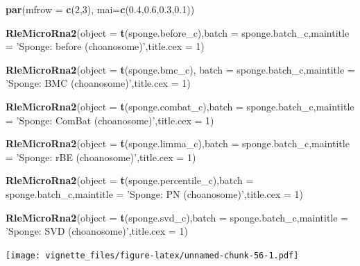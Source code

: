\documentclass[]{book}
\newenvironment{Shaded}{\begin{snugshade}}{\end{snugshade}}
\newcommand{\KeywordTok}[1]{\textcolor[rgb]{0.13,0.29,0.53}{\textbf{#1}}}
\newcommand{\DataTypeTok}[1]{\textcolor[rgb]{0.13,0.29,0.53}{#1}}
\newcommand{\DecValTok}[1]{\textcolor[rgb]{0.00,0.00,0.81}{#1}}
\newcommand{\FloatTok}[1]{\textcolor[rgb]{0.00,0.00,0.81}{#1}}
\newcommand{\StringTok}[1]{\textcolor[rgb]{0.31,0.60,0.02}{#1}}
\newcommand{\NormalTok}[1]{#1}
\begin{document}
\begin{Shaded}
\begin{Highlighting}[]
\KeywordTok{par}\NormalTok{(}\DataTypeTok{mfrow =} \KeywordTok{c}\NormalTok{(}\DecValTok{2}\NormalTok{,}\DecValTok{3}\NormalTok{), }\DataTypeTok{mai=}\KeywordTok{c}\NormalTok{(}\FloatTok{0.4}\NormalTok{,}\FloatTok{0.6}\NormalTok{,}\FloatTok{0.3}\NormalTok{,}\FloatTok{0.1}\NormalTok{))}

\KeywordTok{RleMicroRna2}\NormalTok{(}\DataTypeTok{object =} \KeywordTok{t}\NormalTok{(sponge.before_c),}\DataTypeTok{batch =}\NormalTok{ sponge.batch_c,}\DataTypeTok{maintitle =} \StringTok{'Sponge: before (choanosome)'}\NormalTok{,}\DataTypeTok{title.cex =} \DecValTok{1}\NormalTok{)}

\KeywordTok{RleMicroRna2}\NormalTok{(}\DataTypeTok{object =} \KeywordTok{t}\NormalTok{(sponge.bmc_c), }\DataTypeTok{batch =}\NormalTok{ sponge.batch_c,}\DataTypeTok{maintitle =} \StringTok{'Sponge: BMC (choanosome)'}\NormalTok{,}\DataTypeTok{title.cex =} \DecValTok{1}\NormalTok{)}

\KeywordTok{RleMicroRna2}\NormalTok{(}\DataTypeTok{object =} \KeywordTok{t}\NormalTok{(sponge.combat_c),}\DataTypeTok{batch =}\NormalTok{ sponge.batch_c,}\DataTypeTok{maintitle =} \StringTok{'Sponge: ComBat (choanosome)'}\NormalTok{,}\DataTypeTok{title.cex =} \DecValTok{1}\NormalTok{)}

\KeywordTok{RleMicroRna2}\NormalTok{(}\DataTypeTok{object =} \KeywordTok{t}\NormalTok{(sponge.limma_c),}\DataTypeTok{batch =}\NormalTok{ sponge.batch_c,}\DataTypeTok{maintitle =} \StringTok{'Sponge: rBE (choanosome)'}\NormalTok{,}\DataTypeTok{title.cex =} \DecValTok{1}\NormalTok{)}

\KeywordTok{RleMicroRna2}\NormalTok{(}\DataTypeTok{object =} \KeywordTok{t}\NormalTok{(sponge.percentile_c),}\DataTypeTok{batch =}\NormalTok{ sponge.batch_c,}\DataTypeTok{maintitle =} \StringTok{'Sponge: PN (choanosome)'}\NormalTok{,}\DataTypeTok{title.cex =} \DecValTok{1}\NormalTok{)}

\KeywordTok{RleMicroRna2}\NormalTok{(}\DataTypeTok{object =} \KeywordTok{t}\NormalTok{(sponge.svd_c),}\DataTypeTok{batch =}\NormalTok{ sponge.batch_c,}\DataTypeTok{maintitle =} \StringTok{'Sponge: SVD (choanosome)'}\NormalTok{,}\DataTypeTok{title.cex =} \DecValTok{1}\NormalTok{)}
\end{Highlighting}
\end{Shaded}

\texttt{[image: vignette\_files/figure-latex/unnamed-chunk-56-1.pdf]}
\end{document}
